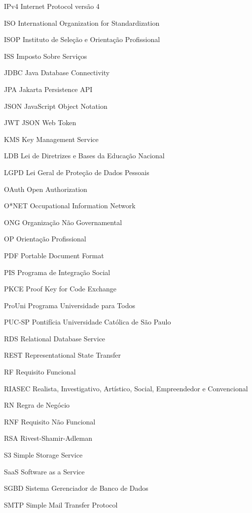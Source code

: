 \begin{siglas}
  \item[IPv4] Internet Protocol versão 4
  \item[ISO] International Organization for Standardization
  \item[ISOP] Instituto de Seleção e Orientação Profissional
  \item[ISS] Imposto Sobre Serviços
  \item[JDBC] Java Database Connectivity
  \item[JPA] Jakarta Persistence API
  \item[JSON] JavaScript Object Notation
  \item[JWT] JSON Web Token
  \item[KMS] Key Management Service
  \item[LDB] Lei de Diretrizes e Bases da Educação Nacional
  \item[LGPD] Lei Geral de Proteção de Dados Pessoais
  \item[OAuth] Open Authorization
  \item[O*NET] Occupational Information Network
  \item[ONG] Organização Não Governamental
  \item[OP] Orientação Profissional
  \item[PDF] Portable Document Format
  \item[PIS] Programa de Integração Social
  \item[PKCE] Proof Key for Code Exchange
  \item[ProUni] Programa Universidade para Todos
  \item[PUC-SP] Pontifícia Universidade Católica de São Paulo
  \item[RDS] Relational Database Service
  \item[REST] Representational State Transfer
  \item[RF] Requisito Funcional
  \item[RIASEC] Realista, Investigativo, Artístico, Social, Empreendedor e Convencional
  \item[RN] Regra de Negócio
  \item[RNF] Requisito Não Funcional
  \item[RSA] Rivest-Shamir-Adleman
  \item[S3] Simple Storage Service
  \item[SaaS] Software as a Service
  \item[SGBD] Sistema Gerenciador de Banco de Dados
  \item[SMTP] Simple Mail Transfer Protocol

\end{siglas}
